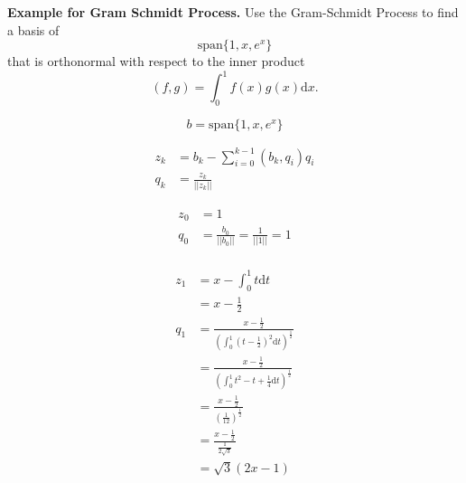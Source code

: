\textbf{Example for Gram Schmidt Process.} Use the Gram-Schmidt
Process to find a basis of \[\mathrm{span}\{1, x, e^x\}\] that is orthonormal
with respect to the inner product \[(f,g) = \int_0^1 f(x) g(x)
\mathrm{d}x.\]

{\color{blue}


\[
b = \text{span} \{ 1, x, e^x \}
\]

\[
\begin{aligned}
z_k &= b_k - \sum_{i=0}^{k-1} (b_k, q_i) q_i \\
q_k &= \frac{z_k}{||z_k||}
\end{aligned}
\]

\[
\begin{aligned}
z_0 &= 1 \\
q_0 &= \frac{b_0}{|| b_0 ||} = \frac{1}{|| 1 ||} = 1 \\
\end{aligned}
\]

\[
\begin{aligned}
z_1 &= x - \int_0^1 t \text{d}t \\
&= x - \frac{1}{2} \\
q_1 &= \frac{x - \frac{1}{2}}{(\int_0^1 (t - \frac{1}{2})^2 \text{d}t)^{\frac{1}{2}}} \\
&= \frac{x - \frac{1}{2}}
{(\int_0^1 t^2 - t + \frac{1}{4} \text{d}t)^{\frac{1}{2}}} \\
&= \frac{x - \frac{1}{2}}
{(\frac{1}{12})^{\frac{1}{2}}} \\
&= \frac{x - \frac{1}{2}}
{\frac{1}{2 \sqrt{3}}} \\
&= \sqrt{3}(2x - 1)
\end{aligned}
\]

}
